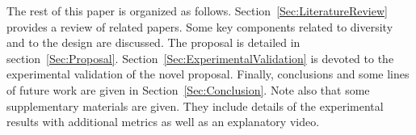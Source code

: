 The rest of this paper is organized as follows. 
%
Section~\ref{Sec:LiteratureReview} provides a review of related papers.
%
Some key components related to diversity and to the \VSDMOEA{} design are discussed.
%
The \VSDMOEA{} proposal is detailed in section~\ref{Sec:Proposal}.
%
Section~\ref{Sec:ExperimentalValidation} is devoted to the experimental validation of the novel proposal.
%
Finally, conclusions and some lines of future work are given in Section~\ref{Sec:Conclusion}.
%
Note also that some supplementary materials are given.
%
They include details of the experimental results with additional metrics as well as an explanatory video.

